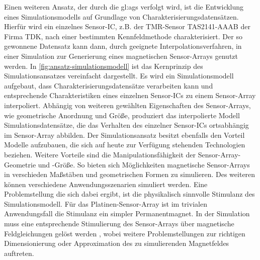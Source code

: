 Einen weiteren Ansatz, der durch die \gls{gl:ags} verfolgt wird, ist die Entwicklung eines Simulationsmodells auf 
Grundlage von Charakterisierungsdatensätzen. Hierfür wird ein einzelnes Sensor-IC, z.B. der TMR-Sensor TAS2141-AAAB der 
Firma TDK, nach einer bestimmten Kennfeldmethode \cite{Schuethe2019} charakterisiert. Der so gewonnene Datensatz kann 
dann, durch geeignete Interpolationsverfahren, in einer Simulation zur Generierung eines magnetischen Sensor-Arrays 
genutzt werden. In \autoref{fig:ansatz-simulationsmodell} ist das Kernprinzip des Simulationsansatzes vereinfacht 
dargestellt. Es wird ein Simulationsmodell aufgebaut, dass Charakterisierungsdatensätze verarbeiten kann und 
entsprechende Charakteristiken eines einzelnen Sensor-ICs zu einem Sensor-Array interpoliert. Abhängig von weiteren 
gewählten Eigenschaften des Sensor-Arrays, wie geometrische Anordnung und Größe, produziert das interpolierte Modell 
Simulationsdatensätze, die das Verhalten des einzelner Sensor-ICs ortsabhängig im Sensor-Array abbilden.
\newline
Der Simulationsansatz besitzt ebenfalls den Vorteil Modelle aufzubauen, die sich auf heute zur Verfügung stehenden Technologien beziehen. Weitere Vorteile sind die Manipulationsfähigkeit der Sensor-Array-Geometrie und -Größe. So bieten sich Möglichkeiten magnetische Sensor-Arrays in verschieden Maßstäben und geometrischen Formen zu simulieren. Des weiteren können verschiedene Anwendungsszenarien simuliert werden. Eine Problemstellung die sich dabei ergibt, ist die physikalisch sinnvolle Stimulanz des Simulationsmodell. Für das Platinen-Sensor-Array ist im trivialen Anwendungsfall die Stimulanz ein simpler Permanentmagnet. In der Simulation muss eine entsprechende Stimulierung des Sensor-Arrays über magnetische Feldgleichungen gelöst werden \cite{Pape2017}\cite{Schuethe2019}, wobei weitere Problemstellungen zur richtigen Dimensionierung oder Approximation des zu simulierenden Magnetfeldes auftreten.

